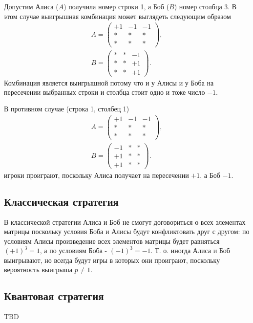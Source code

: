 \begin{example}
Допустим Алиса ($A$) получила номер строки 1, а Боб ($B$) номер
столбца 3. В этом случае выигрышная комбинация может выглядеть
следующим образом  
\begin{eqnarray}
A = \left(
\begin{array}{ccc}
+1 & -1 & -1 \\
\ast & \ast & \ast \\
\ast & \ast & \ast  
\end{array}
\right),
\nonumber \\
B = \left(
\begin{array}{ccc}
\ast & \ast & -1 \\
\ast & \ast & +1 \\
\ast & \ast & +1  
\end{array}
\right).
\nonumber 
\end{eqnarray}
Комбинация является выигрышной потому что и у Алисы и у Боба на
пересечении выбранных строки и столбца стоит одно и тоже число $-1$. 


В противном случае (строка 1, столбец 1) 
\begin{eqnarray}
A = \left(
\begin{array}{ccc}
+1 & -1 & -1 \\
\ast & \ast & \ast \\
\ast & \ast & \ast  
\end{array}
\right),
\nonumber \\
B = \left(
\begin{array}{ccc}
-1 & \ast & \ast \\
+1 & \ast & \ast \\
+1 & \ast & \ast  
\end{array}
\right).
\nonumber 
\end{eqnarray}
игроки проиграют, поскольку Алиса получает на пересечении $+1$, а Боб
$-1$. 
\end{example}


\subsection{Классическая стратегия}
В классической стратегии Алиса и Боб не смогут договориться о всех
элементах матрицы поскольку условия Боба и Алисы будут конфликтовать
друг с другом: по условиям Алисы произведение всех элементов матрицы
будет равняться $(+1)^3 = 1$, а по условиям Боба - $(-1)^3 = -1$.
Т. о. иногда Алиса и Боб выигрывают, но всегда будут игры в которых
они проиграют, поскольку вероятность выигрыша $p \ne 1$.

\subsection{Квантовая стратегия}
TBD
